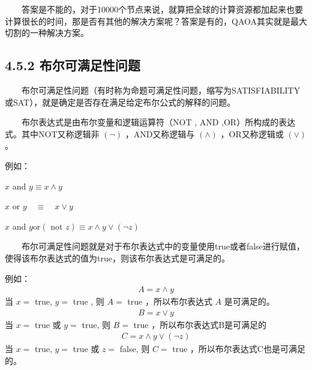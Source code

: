 \documentclass[a4paper,11pt,english]{sphinxmanual}
\begin{document}
\sphinxAtStartPar
  答案是不能的，对于10000个节点来说，就算把全球的计算资源都加起来也要计算很长的时间，那是否有其他的解决方案呢？答案是有的，QAOA其实就是最大切割的一种解决方案。


\subsection{4.5.2 布尔可满足性问题}
\label{\detokenize{rst/4.5QAOA_u7b97_u6cd5:id2}}
\sphinxAtStartPar
  布尔可满足性问题（有时称为命题可满足性问题，缩写为SATISFIABILITY或SAT），就是确定是否存在满足给定布尔公式的解释的问题。

\sphinxAtStartPar
  布尔表达式是由布尔变量和逻辑运算符（NOT , AND ,OR）所构成的表达式。其中NOT又称逻辑非 \((\neg)\) ，AND又称逻辑与 \((\wedge)\) ，OR又称逻辑或 \((\vee)\) 。

\sphinxAtStartPar
例如：

\begin{center}\(x\) and  \(y \equiv x \wedge y\)
\end{center}
\begin{center}\(x\) or  \(y \quad \equiv \quad x \vee y\)
\end{center}
\begin{center}\(x\) and  \(y \text{or}(\text{ not } z) \equiv x \wedge y \vee(\neg z)\)
\end{center}
\sphinxAtStartPar
  布尔可满足性问题就是对于布尔表达式中的变量使用true或者false进行赋值，使得该布尔表达式的值为true，则该布尔表达式是可满足的。

\sphinxAtStartPar
例如：
\begin{equation*}
\begin{split}A=x \wedge y\end{split}
\end{equation*}
\sphinxAtStartPar
当  \(x=\) true, \(y=\) true , 则  \(A=\) true ，所以布尔表达式 \(A\) 是可满足的。
\begin{equation*}
\begin{split}B=x \vee y\end{split}
\end{equation*}
\sphinxAtStartPar
当  \(x=\) true 或  \(y=\) true, 则  \(B=\) true ，所以布尔表达式B是可满足的
\begin{equation*}
\begin{split}C=x \wedge y \vee(\neg z)\end{split}
\end{equation*}
\sphinxAtStartPar
当  \(x=\) true, \(y=\) true 或  \(z=\)  false, 则  \(C=\) true ，所以布尔表达式C也是可满足的。
\end{document}
